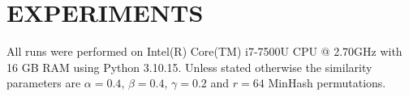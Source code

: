 \documentclass[sigconf]{acmart}
\begin{document}







\section{EXPERIMENTS}
\label{sec:experiments}

All runs were performed on Intel(R) Core(TM) i7-7500U CPU @ 2.70GHz with 16 GB RAM using
Python 3.10.15.  Unless stated otherwise the similarity parameters are
\(\alpha = 0.4\), \(\beta = 0.4\), \(\gamma = 0.2\) and
\(r = 64\) MinHash permutations.
\end{document}
